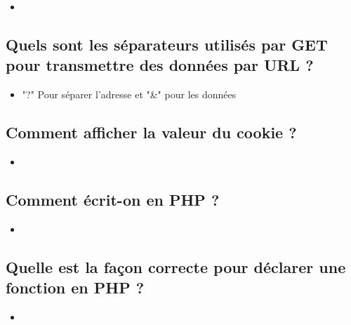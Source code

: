 \documentclass[11pt,a4paper]{article}
\begin{document}

\bigskip

\begin{itemize}
\item[\CaseCoche]  \\
\end{itemize}


\subsection{Quels sont les séparateurs utilisés par GET pour transmettre des données par URL ?}

\begin{itemize}
\item[\CaseCoche] "?" Pour séparer l'adresse et "\&" pour les données \\
\end{itemize}


\subsection{Comment afficher la valeur du cookie  ?}

\begin{itemize}
\item[\CaseCoche]  \\
\end{itemize}


\subsection{Comment écrit-on  en PHP ?}

\begin{itemize}
\item[\CaseCoche]  \\
\end{itemize}


\subsection{Quelle est la façon correcte pour déclarer une fonction  en PHP ?}

\begin{itemize}
\item[\CaseCoche]  \\
\end{itemize}
\end{document}
